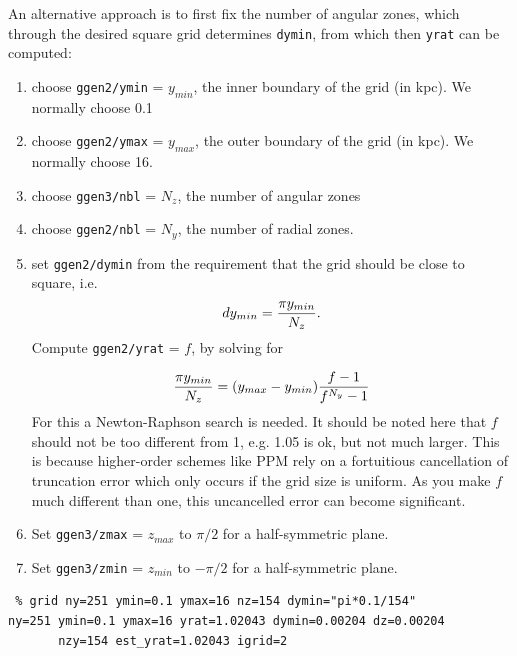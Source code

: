 \documentclass[10pt,dvips]{article}
\begin{document}
An alternative approach is to first fix the number of angular zones, which  through
the desired square grid determines {\tt dymin},
from which then {\tt yrat} can be computed:

\begin{enumerate}
\item
choose  {\tt ggen2/ymin} = $y_{min}$, the inner boundary of the grid (in kpc).
We normally choose 0.1

\item
choose {\tt ggen2/ymax} = $y_{max}$, the outer boundary of the grid (in kpc).
We normally choose 16.

\item
choose {\tt ggen3/nbl} = $N_z$, the number of angular zones

\item
choose {\tt ggen2/nbl} = $N_y$, the number of radial zones.

\item
set {\tt ggen2/dymin} from the requirement that the grid should
be close to square, i.e.
$$
   dy_{min} = {  {\pi y_{min}} \over N_z}.
$$
Compute {\tt ggen2/yrat} = $f$, by solving for

$$
   {{\pi y_{min}} \over N_z} = (y_{max}-y_{min}) { {f-1} \over {f^{N_y}-1} }
$$
For this a Newton-Raphson search is needed. It should be noted here that $f$ should 
not be too different from 1, e.g. 1.05 is ok, but not much larger. This is because
higher-order schemes like PPM rely on a fortuitious cancellation of 
truncation error which only occurs if the grid size is uniform.  As you 
make $f$ much different than one, this uncancelled error can become 
significant.  

\item
Set {\tt ggen3/zmax} = $z_{max}$  to $\pi/2$ for a half-symmetric plane.

\item
Set {\tt ggen3/zmin} = $z_{min}$ to $-\pi/2$ for a half-symmetric plane.

\end{enumerate}


\begin{verbatim}
 % grid ny=251 ymin=0.1 ymax=16 nz=154 dymin="pi*0.1/154"
ny=251 ymin=0.1 ymax=16 yrat=1.02043 dymin=0.00204 dz=0.00204 
       nzy=154 est_yrat=1.02043 igrid=2

\end{verbatim}
\end{document}

